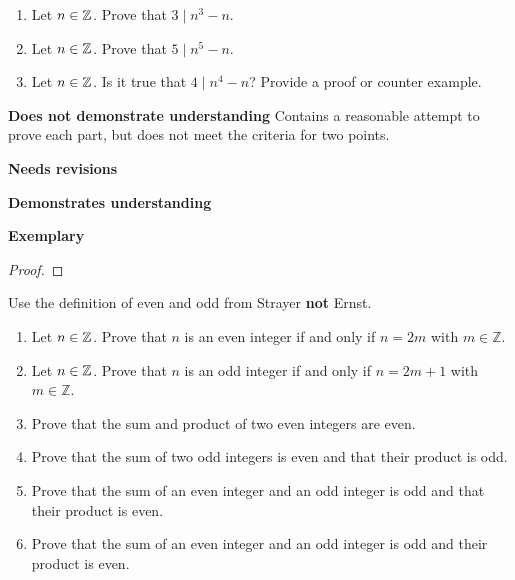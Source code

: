 \documentclass[letterpaper, 11pt]{ximera}
\begin{document}
\begin{ex}
 	\begin{enumerate}[label=(\alph*)]
		\item Let $n\in\mathbb Z$. Prove that $3\mid n^3-n$.
		\item Let $n\in\mathbb Z$. Prove that $5\mid n^5-n$.
		\item Let $n\in\mathbb Z$. Is it true that $4\mid n^4-n$? Provide a proof or counter example.
	\end{enumerate}
\end{ex}

\begin{writeRubric}
    \item \textbf{Does not demonstrate understanding}
     Contains a reasonable attempt to prove each part, but does not meet the criteria for two points.
    \item \textbf{Needs revisions}
     
    \item \textbf{Demonstrates understanding}
    
    \item \textbf{Exemplary}
        
\end{writeRubric}
                                       
\begin{proof}
\end{proof}

\begin{ex} Use the definition of even and odd from Strayer \textbf{not} Ernst.
 \begin{enumerate}[label=(\alph*)]
 		\item Let $n\in\mathbb Z$. Prove that $n$ is an even integer if and only if $n=2m$ with $m\in\mathbb{Z}$.
		\item Let $n\in\mathbb Z$. Prove that $n$ is an odd integer if and only if $n=2m+1$ with $m\in\mathbb{Z}$.
		\item Prove that the sum and product of two even integers are even.
		\item Prove that the sum of two odd integers is even and that their product is odd.
		\item Prove that the sum of an even integer and an odd integer is odd and that their product is even.
		\item Prove that the sum of an even integer and an odd integer is odd and their product is even.
	\end{enumerate}

\end{ex}
\end{document}
